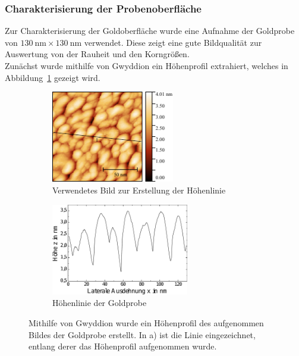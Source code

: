 \documentclass[a4paper,twoside,final]{article}
\begin{document}
\subsubsection{Charakterisierung der Probenoberfläche}
Zur Charakterisierung der Goldoberfläche wurde eine Aufnahme der Goldprobe von $\SI{130}{\nano\metre}\times\SI{130}{\nano\metre}$ verwendet. Diese zeigt eine gute Bildqualität zur Auswertung von der Rauheit und den Korngrößen.\\
Zunächst wurde mithilfe von Gwyddion ein Höhenprofil extrahiert, welches in Abbildung~\ref{fig:HoehenprofilGold} gezeigt wird.
\begin{figure}[htp]
    \centering
    \begin{subfigure}{0.45\textwidth}
        \includegraphics[height=4cm]{Bilder/Image01963_Bild_Hoehenprofil.pdf}
        \caption{Verwendetes Bild zur Erstellung der Höhenlinie}
    \end{subfigure}
    \hspace{0.5cm}
    \begin{subfigure}{0.45\textwidth}
        \includegraphics[height=4cm]{Bilder/Image01963_Hoehenprofil.pdf}
        \caption{Höhenlinie der Goldprobe\\}
    \end{subfigure}
    \caption{Mithilfe von Gwyddion wurde ein Höhenprofil des aufgenommen Bildes der Goldprobe erstellt. In a) ist die Linie eingezeichnet, entlang derer das Höhenprofil aufgenommen wurde.}
    \label{fig:HoehenprofilGold}
\end{figure}\\
\end{document}
